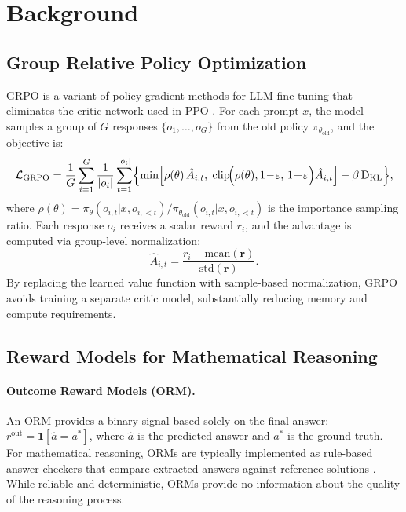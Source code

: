\section{Background}
\label{sec:background}

\subsection{Group Relative Policy Optimization}
\label{sec:bg-grpo}

GRPO \citep{shao2024deepseekmath} is a variant of policy gradient methods for LLM fine-tuning that eliminates the critic network used in PPO \citep{schulman2017proximal}. For each prompt $x$, the model samples a group of $G$ responses $\{o_1, \ldots, o_G\}$ from the old policy $\pi_{\theta_{\text{old}}}$, and the objective is:
\begin{equation}
\label{eq:grpo-loss}
\resizebox{\columnwidth}{!}{$
\begin{aligned}
\mathcal{L}_{\text{GRPO}}=
\frac{1}{G}\sum_{i=1}^{G}\frac{1}{|o_i|}\sum_{t=1}^{|o_i|}
\Bigl\{
  \min\Bigl[
  \rho(\theta)\,\hat{A}_{i,t},\;
  \operatorname{clip}\!\Bigl(\rho(\theta), 1\!-\!\varepsilon,\, 1\!+\!\varepsilon\Bigr)\hat{A}_{i,t}
  \Bigr]
  -\beta\,\mathrm{D}_{\mathrm{KL}}
\Bigr\},
\end{aligned}
$}
\end{equation}
where $\rho(\theta) = \pi_\theta(o_{i,t} | x, o_{i,<t}) / \pi_{\theta_{\text{old}}}(o_{i,t} | x, o_{i,<t})$ is the importance sampling ratio. Each response $o_i$ receives a scalar reward $r_i$, and the advantage is computed via group-level normalization:
\begin{equation}
\label{eq:grpo-adv}
\hat{A}_{i,t} = \frac{r_i - \mathrm{mean}(\mathbf{r})}{\mathrm{std}(\mathbf{r})}.
\end{equation}
By replacing the learned value function with sample-based normalization, GRPO avoids training a separate critic model, substantially reducing memory and compute requirements.

\subsection{Reward Models for Mathematical Reasoning}
\label{sec:bg-rm}

\paragraph{Outcome Reward Models (ORM).}
An ORM provides a binary signal based solely on the final answer: $r^{\text{out}} = \mathbf{1}[\hat{a} = a^*]$, where $\hat{a}$ is the predicted answer and $a^*$ is the ground truth. For mathematical reasoning, ORMs are typically implemented as rule-based answer checkers that compare extracted answers against reference solutions \citep{hendrycks2021measuring}. While reliable and deterministic, ORMs provide no information about the quality of the reasoning process.

